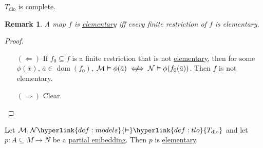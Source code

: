 \documentclass{article}
\let\models\vDash
\DeclareMathOperator{\dom}{dom}
\DeclareMathOperator{\img}{img}
\newtheorem{nremark}[nthm]{Remark}
\begin{document}
\begin{ncor}\label{cor:4.9}
  \hyperlink{def:tlo}{$T_{\text{dlo}}$} is \hyperlink{def:complete}{complete}.
\end{ncor}
\begin{nremark}\label{rem:4.11}
  A map $f$ is \hyperlink{def:elmap}{elementary} iff every finite restriction of $f$ is elementary.
\end{nremark}
\begin{proof}\leavevmode
  \begin{itemize}
    \item[$(\Leftarrow)$] If $f_0 \subseteq f$ is a finite restriction that is not \hyperlink{def:elmap}{elementary}, then for some $\phi(\bar{x})$, $\bar{a} \in \dom(f_0)$, $\mathcal{M} \models \phi(\bar{a}) \centernot\iff \mathcal{N} \models \phi(f_0(\bar{a}))$.
    Then $f$ is not elementary.

  \item[$(\Rightarrow)$] Clear.\qedhere
  \end{itemize}
\end{proof}
\begin{nprop}\label{prop:4.12}
  Let $\mathcal{M}, \mathcal{N} \hyperlink{def:models}{\models} \hyperlink{def:tlo}{T_{\text{dlo}}}$ and let $p: A \subseteq M \to N$ be a \hyperlink{def:pe}{partial embedding}.
  Then $p$ is \hyperlink{def:elmap}{elementary}.
\end{nprop}
\end{document}
